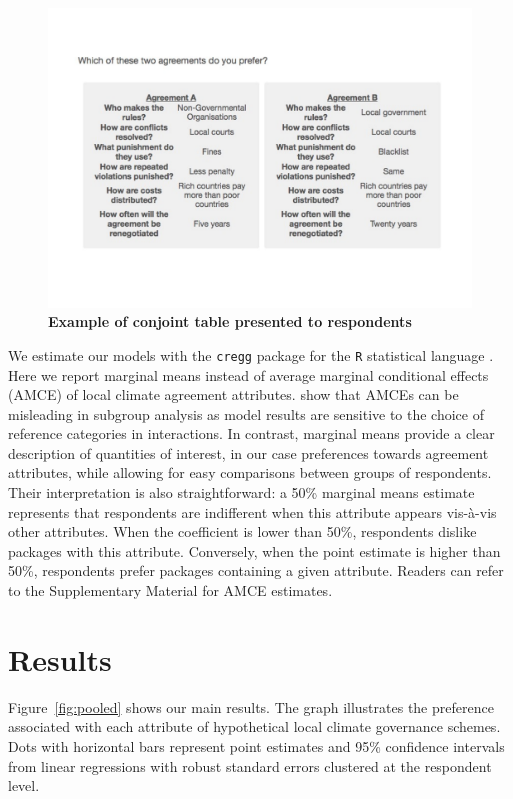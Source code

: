 \documentclass[a4paper,12pt]{article}
\begin{document}
\begin{figure}[H]
	\centering
	\includegraphics[width=15cm]{conjoint-cropped.pdf}
	\caption{\textbf{Example of conjoint table presented to respondents}}
	\label{fig:conjoint}
\end{figure}

We estimate our models with the \texttt{cregg} package \citep{leeper2018cregg} for the \texttt{R} statistical language \citep{rstats2019}. Here we report marginal means instead of average marginal conditional effects (AMCE) of local climate agreement attributes. \citet{leeper2018subgroup} show that AMCEs can be misleading in subgroup analysis as model results are sensitive to the choice of reference categories in interactions. In contrast, marginal means provide a clear description of quantities of interest, in our case preferences towards agreement attributes, while allowing for easy comparisons between groups of respondents. Their interpretation is also straightforward: a 50\% marginal means estimate represents that respondents are indifferent when this attribute appears vis-\`{a}-vis other attributes. When the coefficient is lower than 50\%, respondents dislike packages with this attribute. Conversely, when the point estimate is higher than 50\%, respondents prefer packages containing a given attribute. Readers can refer to the Supplementary Material for AMCE estimates.

\section{Results}%
\label{sec:results}

Figure~\ref{fig:pooled} shows our main results. The graph illustrates the preference associated with each attribute of hypothetical local climate governance schemes. Dots with horizontal bars represent point estimates and 95\% confidence intervals from linear regressions with robust standard errors clustered at the respondent level. 
\end{document}
